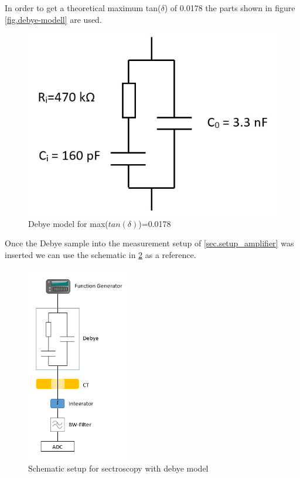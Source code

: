 In order to get a theoretical maximum tan($\delta$) of 0.0178 the parts shown in figure \ref{fig.debye-modell} are used. 
\begin{figure}[h!tb]
	\centerline{\includegraphics[scale=0.7]{figures/Method/debye-modell.jpg}}	
	\caption{Debye model for max($tan(\delta)$)=0.0178 }	
	\label{fig.debye-modellsch}
\end{figure}

Once the Debye sample into the measurement setup of \ref{sec.setup_amplifier} was inserted we can use the schematic in \ref{fig.presentation} as a reference.

\begin{figure}[h!tb]
	\centerline{\includegraphics[width=0.4\textwidth]{figures/Method/setup/low_voltage_setup.png}}	
	\caption{Schematic setup for sectroscopy with debye model}	
	\label{fig.presentation}
\end{figure}

